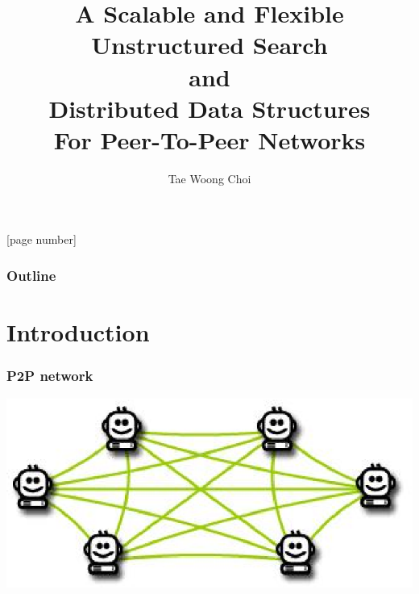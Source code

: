 \documentclass[red]{beamer}
\title[Building P2P Modules]{A Scalable and Flexible Unstructured Search \\
and \\
Distributed Data Structures \\
For Peer-To-Peer Networks}
\author{Tae Woong Choi}
\institute[UF ECE]{University of Florida, Department of Electrical and Computer
Engineering}
\begin{document}
[page number]
\frame{\titlepage}



\begin{frame}
\frametitle{Outline}
\tableofcontents[]
\end{frame}

\section{Introduction}

\begin{frame}
\frametitle{P2P network}
\centering
\includegraphics[scale=1]{figs/p2p}
\end{frame}
\end{document}
